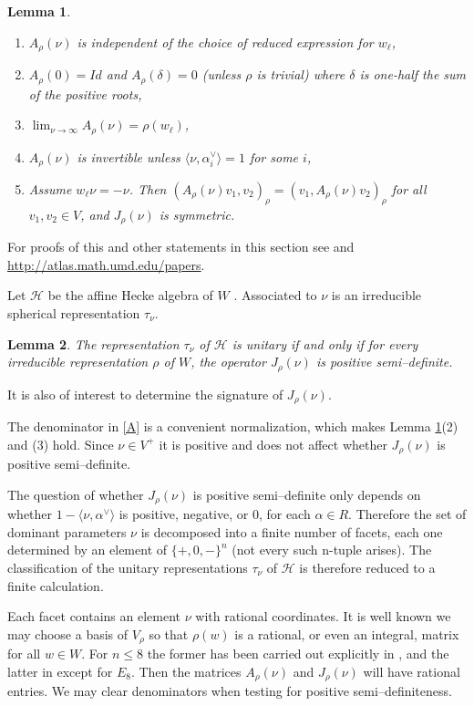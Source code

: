 \documentclass{acm_proc_article-sp}
\renewcommand{\H}{{\mathcal H}}
\newcommand{\ch}[1]{#1^\vee}
\newcommand\brach[2]{\langle#1,\ch#2\rangle}
\newtheorem{lemma}{Lemma}
\begin{document}
\begin{lemma}
\label{properties}
\begin{enumerate}
\item $A_\rho(\nu)$ is independent of the choice of reduced
expression for $w_\ell$,
\item $A_\rho(0)=Id$ and $A_\rho(\delta)=0$ (unless $\rho$ is
  trivial) where $\delta$ is one-half
  the sum of the positive roots,
\item $\lim_{\nu\rightarrow\infty}A_\rho(\nu)=\rho(w_\ell)$,
\item $A_\rho(\nu)$ is invertible unless $\brach\nu{\alpha_i}=1$ for
some $i$,
\item Assume $w_\ell\nu=-\nu$. Then $(A_\rho(\nu)v_1,v_2)_\rho=(v_1,A_\rho(\nu)v_2)_\rho$ for all
$v_1,v_2\in V$, and $J_\rho(\nu)$ is symmetric.
\end{enumerate}
\end{lemma}

For proofs of this and other statements in this section see
\cite{barbasch_spherical} and 
\url{http://atlas.math.umd.edu/papers}.

Let $\H$ be the affine Hecke algebra of $W$ \cite[Chapter 7]{humphreys_coxeter}.
Associated to $\nu$ is an irreducible spherical representation $\tau_{\nu}$.


\begin{lemma}
\label{tau}
The representation $\tau_\nu$ of $\H$ is unitary if and only if 
for every irreducible representation $\rho$ of $W$, the operator
$J_\rho(\nu)$ is positive semi--definite.
\end{lemma}

It is also of interest to determine the signature of $J_\rho(\nu)$.

The denominator in \eqref{A} is a convenient normalization, which
makes Lemma \ref{properties}(2) and (3) hold. 
Since
$\nu\in V^+$ it is positive and does not affect whether
$J_\rho(\nu)$ is positive semi--definite.

The question of whether $J_\rho(\nu)$ is positive
semi--definite only depends on whether $1-\brach\nu\alpha$ is
positive, negative, or $0$, for each $\alpha\in R$. Therefore the set
of dominant parameters $\nu$ is decomposed into a finite number of
facets, each one determined by an element of $\{+,0,-\}^n$ (not every
such n-tuple arises). 
The classification of the unitary representations $\tau_\nu$ of 
$\H$ is therefore reduced to a finite calculation.

Each facet contains an element $\nu$ with rational coordinates. It is
well known we may choose a basis of $V_\rho$ so that $\rho(w)$ is
a rational, or even an integral, matrix for all $w\in W$. For $n\le 8$
the former has been carried out explicitly in \cite{stembridge_models}, and
the latter in \cite{adams_models} except for $E_8$. Then the matrices
$A_\rho(\nu)$ and $J_\rho(\nu)$ will have rational
entries.  We may clear denominators when testing for positive
semi--definiteness. 
\end{document}
